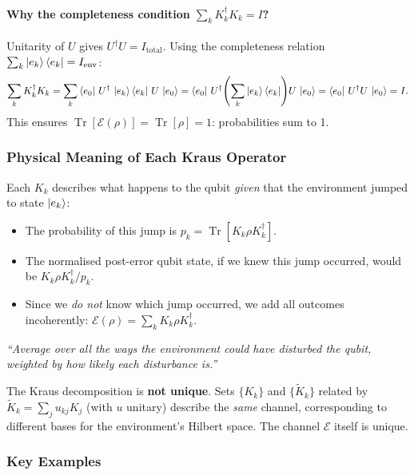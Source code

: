 \documentclass[11pt, a4paper]{article}
\theoremstyle{definition}
\theoremstyle{plain}
\theoremstyle{remark}
\newcommand{\Tr}{\operatorname{Tr}}
\begin{document}
\paragraph{Why the completeness condition $\sum_k K_k^\dagger K_k = I$?}
Unitarity of $U$ gives $U^\dagger U = I_{\mathrm{total}}$.  Using the
completeness relation $\sum_k \ket{e_k}\bra{e_k} = I_{\mathrm{env}}$:
\[
  \sum_k K_k^\dagger K_k
  = \sum_k \bra{e_0}\,U^\dagger\,\ket{e_k}\bra{e_k}\,U\,\ket{e_0}
  = \bra{e_0}\,U^\dagger\!\left(\sum_k\ket{e_k}\bra{e_k}\right)\!U\,\ket{e_0}
  = \bra{e_0}\,U^\dagger U\,\ket{e_0}
  = I.
\]
This ensures $\Tr[\mathcal{E}(\rho)] = \Tr[\rho] = 1$: probabilities sum
to 1.

\subsubsection{Physical Meaning of Each Kraus Operator}

Each $K_k$ describes what happens to the qubit \emph{given} that the
environment jumped to state $\ket{e_k}$:
\begin{itemize}
  \item The probability of this jump is $p_k = \Tr[K_k \rho K_k^\dagger]$.
  \item The normalised post-error qubit state, if we knew this jump
        occurred, would be $K_k\rho K_k^\dagger / p_k$.
  \item Since we \emph{do not} know which jump occurred, we add all
        outcomes incoherently: $\mathcal{E}(\rho) = \sum_k K_k\rho K_k^\dagger$.
\end{itemize}
\begin{center}
\emph{``Average over all the ways the environment could have disturbed
the qubit, weighted by how likely each disturbance is.''}
\end{center}

\begin{caution}
The Kraus decomposition is \textbf{not unique}.  Sets $\{K_k\}$ and
$\{\tilde{K}_k\}$ related by $\tilde{K}_k = \sum_j u_{kj} K_j$ (with $u$
unitary) describe the \emph{same} channel, corresponding to different bases
for the environment's Hilbert space.  The channel $\mathcal{E}$ itself is
unique.
\end{caution}

\subsubsection{Key Examples}
\end{document}
